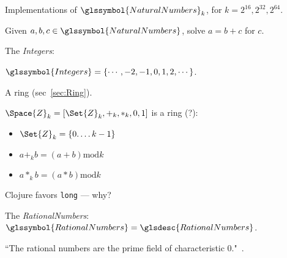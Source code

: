 Implementations of $\glssymbol{NaturalNumbers}_{k}$,
for $k = 2^{16}, 2^{32}, 2^{64}$.

\label{sec:Integers}

Given $a,b,c \in \glssymbol{NaturalNumbers}$,
solve $a = b + c$ for $c$.

The \textit{\gls{Integers}}: 

$\glssymbol{Integers} = \{\cdots, -2, -1, 0, 1, 2, \cdots\}$.

A ring (sec~\ref{sec:Ring}).

\label{sec:Cyclic-integers}

$\Space{Z}_{k} = \left[ \Set{Z}_{k}, +_k, *_k, 0, 1 \right]$
is a ring (?):
\begin{itemize}
  \item $\Set{Z}_{k} = \left\{ 0. \ldots k-1  \right\}$
  \item $ a +_k b = \left( a + b \right) \text{mod} k$
  \item $ a *_k b = \left( a * b \right) \text{mod} k$
\end{itemize}

\label{sec:int}

Clojure favors \texttt{long} --- why?

\label{sec:BigInteger}

\label{sec:Rational-numbers}

The \textit{\gls{RationalNumbers}}: 
$\glssymbol{RationalNumbers} = \glsdesc{RationalNumbers}$.

\label{sec:Axiomatic_definition_of_Q}

``The rational numbers are the prime field of characteristic 
0."~\cite{quora:Rational_axioms}.

